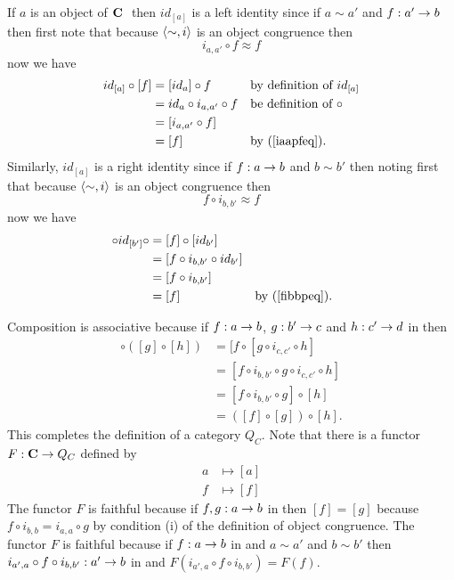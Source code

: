 \documentclass[10pt,a4paper]{scrartcl}
\begin{document}
If $a$ is an object of $\textbf{C}\ $ then $id_{[a]}$ is a left identity since if  $a \sim a'$ and $f:a' \rightarrow b$ then 
first note that because $\langle\sim,i\rangle$ is an object congruence then
\begin{equation}
\label{iaapfeq}
i_{a,a'} \circ f  \approx f
\end{equation}
now we have 
\begin{align*}
id_{[a]} \circ [f] 
         & = [id_a] \circ f               && \mbox{by definition of $id_{[a]}$}    \\
				 & = id_a \circ i_{a,a'} \circ f  && \mbox{be definition of $\circ$}       \\
         &= [i_{a,a'} \circ f]                                                     \\
         &= [f]                           && \mbox {by (\ref{iaapfeq}). }
\end{align*}
Similarly, $id_{[a]}$ is a right identity since if $f:a \rightarrow b$ and $b \sim b'$  then
noting first  that because $\langle\sim,i\rangle$ is an object congruence then
\begin{equation}
\label{fibbpeq}
 f \circ i_{b,b'} \approx f
\end{equation}
now we have 
\begin{align*}
[f] \circ id_{[b']} \circ  
                 & = [f]  \circ [id_{b'}]                                     \\
                 &=  [f \circ i_{b,b'} \circ id_{b'} ]                                  \\
                 &=  [f \circ i_{b,b'} ]                                                \\
                 &=  [f]                               &&\mbox {by (\ref{fibbpeq}). }
\end{align*}


Composition is associative because if $f:a \rightarrow b$, $g: b' \rightarrow c$  and $h: c' \rightarrow d$ in \catcw then
\begin{align*}
[f] \circ ([g] \circ [h]) &= [f \circ [g \circ i_{c,c'} \circ h]               \\
                          &= [f \circ i_{b,b'} \circ g \circ i_{c,c'} \circ h] \\
													&= [f \circ i_{b,b'} \circ g] \circ [h]              \\
													&= ([f] \circ [g]) \circ [h].
\end{align*}
This completes the definition of a category $Q_C$.
Note that there is a functor $F: \textbf{C} \rightarrow Q_C$ defined by
\begin{align*}
       a & \mapsto [a] \\
			 f & \mapsto [f]
\end{align*}
The functor $F$ is faithful because if $f,g : a \rightarrow b$ in \catcw then $[f]=[g]$ because $f \circ i_{b,b}=i_{a,a} \circ g$ by condition (i) of the definition of object congruence.
The functor $F$ is faithful because if $f:a \rightarrow b$ in \catcw and $a \sim a'$ and
$b \sim b'$ then $i_{a',a} \circ f \circ i_{b,b'}: a' \rightarrow b$ in \catcw and 
$F(i_{a',a} \circ f \circ i_{b,b'})=F(f)$.  
\end{document}

